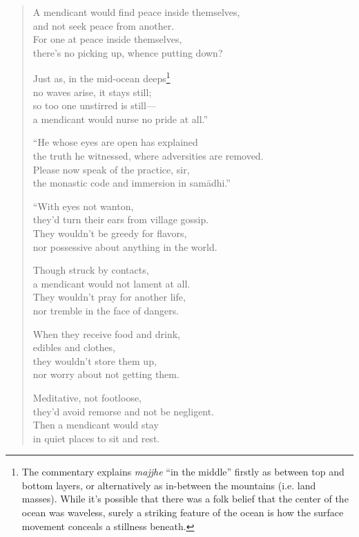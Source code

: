 \documentclass[12pt,openany]{book}%
\begin{document}
\begin{verse}
A mendicant would find peace inside themselves, \\
and not seek peace from another. \\
For one at peace inside themselves, \\
there’s no picking up, whence putting down? 

Just as, in the mid-ocean deeps\footnote{The commentary explains \textit{majjhe} “in the middle” firstly as between top and bottom layers, or alternatively as in-between the mountains (i.e. land masses). While it’s possible that there was a folk belief that the center of the ocean was waveless, surely a striking feature of the ocean is how the surface movement conceals a stillness beneath. } \\
no waves arise, it stays still; \\
so too one unstirred is still—\\
a mendicant would nurse no pride at all.” 

“He whose eyes are open has explained \\
the truth he witnessed, where adversities are removed. \\
Please now speak of the practice, sir, \\
the monastic code and immersion in \textsanskrit{samādhi}.” 

“With eyes not wanton, \\
they’d turn their ears from village gossip. \\
They wouldn’t be greedy for flavors, \\
nor possessive about anything in the world. 

Though struck by contacts, \\
a mendicant would not lament at all. \\
They wouldn’t pray for another life, \\
nor tremble in the face of dangers. 

When they receive food and drink, \\
edibles and clothes, \\
they wouldn’t store them up, \\
nor worry about not getting them. 

Meditative, not footloose, \\
they’d avoid remorse and not be negligent. \\
Then a mendicant would stay \\
in quiet places to sit and rest. 


\end{verse}
\end{document}
